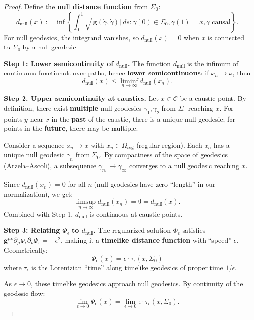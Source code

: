 \begin{proof}
Define the \textbf{null distance function} from $\Sigma_0$:
\begin{equation}\label{eq:nulldist}
    d_{\text{null}}(x) := \inf\left\{\int_0^1 \sqrt{|\mathbf{g}(\dot\gamma, \dot\gamma)|} \, ds : \gamma(0) \in \Sigma_0, \gamma(1) = x, \gamma \text{ causal}\right\}.
\end{equation}
For null geodesics, the integrand vanishes, so $d_{\text{null}}(x) = 0$ when $x$ is connected to $\Sigma_0$ by a null geodesic.

\textbf{Step 1: Lower semicontinuity of $d_{\text{null}}$.}
The function $d_{\text{null}}$ is the infimum of continuous functionals over paths, hence \textbf{lower semicontinuous}: if $x_n \to x$, then
\[
d_{\text{null}}(x) \leq \liminf_{n \to \infty} d_{\text{null}}(x_n).
\]

\textbf{Step 2: Upper semicontinuity at caustics.}
Let $x \in \mathcal{C}$ be a caustic point. By definition, there exist \textbf{multiple} null geodesics $\gamma_1, \gamma_2$ from $\Sigma_0$ reaching $x$. For points $y$ near $x$ in the \textbf{past} of the caustic, there is a unique null geodesic; for points in the \textbf{future}, there may be multiple.

Consider a sequence $x_n \to x$ with $x_n \in \Omega_{\text{reg}}$ (regular region). Each $x_n$ has a unique null geodesic $\gamma_n$ from $\Sigma_0$. By compactness of the space of geodesics (Arzela--Ascoli), a subsequence $\gamma_{n_k} \to \gamma_\infty$ converges to a null geodesic reaching $x$.

Since $d_{\text{null}}(x_n) = 0$ for all $n$ (null geodesics have zero ``length'' in our normalization), we get:
\[
\limsup_{n \to \infty} d_{\text{null}}(x_n) = 0 = d_{\text{null}}(x).
\]
Combined with Step 1, $d_{\text{null}}$ is continuous at caustic points.

\textbf{Step 3: Relating $\Phi_\epsilon$ to $d_{\text{null}}$.}
The regularized solution $\Phi_\epsilon$ satisfies $\mathbf{g}^{\mu\nu}\partial_\mu\Phi_\epsilon\partial_\nu\Phi_\epsilon = -\epsilon^2$, making it a \textbf{timelike distance function} with ``speed'' $\epsilon$. Geometrically:
\[
\Phi_\epsilon(x) = \epsilon \cdot \tau_\epsilon(x, \Sigma_0)
\]
where $\tau_\epsilon$ is the Lorentzian ``time'' along timelike geodesics of proper time $1/\epsilon$.

As $\epsilon \to 0$, these timelike geodesics approach null geodesics. By continuity of the geodesic flow:
\[
\lim_{\epsilon \to 0} \Phi_\epsilon(x) = \lim_{\epsilon \to 0} \epsilon \cdot \tau_\epsilon(x, \Sigma_0).
\]


\end{proof}
